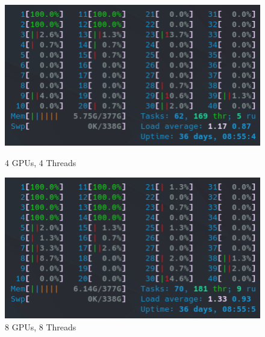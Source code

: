 \begin{figure}[!h]
    \centering
    \captionsetup{width=.48\linewidth}
    \begin{minipage}[t]{0.48\textwidth}
        \includegraphics[width=\textwidth]{figures/htop_gpus/4GPUs_4Threads.png}
        \caption{4 GPUs, 4 Threads}\label{fig:4GPUs_4Threads}
    \end{minipage}
    \hspace{0.4cm}
    \centering
    \captionsetup{width=.48\linewidth}
    \begin{minipage}[t]{0.48\textwidth}
        \includegraphics[width=\textwidth]{figures/htop_gpus/8GPUs_8Threads.png}
        \caption{8 GPUs, 8 Threads}\label{fig:8GPUs_8Threads}
    \end{minipage}


\end{figure}
